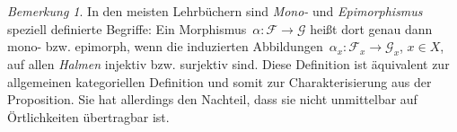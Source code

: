 \documentclass[a4paper,ngerman,12pt]{scrartcl}
\theoremstyle{definition}
\theoremstyle{plain}
\theoremstyle{remark}
\newtheorem{bem}[defn]{Bemerkung}
\newcommand{\F}{\mathcal{F}}
\newcommand{\G}{\mathcal{G}}
\renewcommand{\_}{\mathpunct{.}\,}
\newcommand{\?}{\,{:}\,}
\begin{document}
\begin{bem}In den meisten Lehrbüchern sind \emph{Mono-} und \emph{Epimorphismus} speziell
definierte Begriffe: Ein Morphismus~$\alpha : \F \to \G$ heißt dort genau dann
mono- bzw. epimorph, wenn die induzierten Abbildungen~$\alpha_x : \F_x \to
\G_x$, $x \in X$, auf allen \emph{Halmen} injektiv bzw. surjektiv sind. Diese
Definition ist äquivalent zur allgemeinen kategoriellen Definition und somit
zur Charakterisierung aus der Proposition. Sie hat allerdings den Nachteil, dass sie nicht
unmittelbar auf Örtlichkeiten übertragbar ist.\end{bem}


\nocite{*}
\printbibliography
\end{document}
